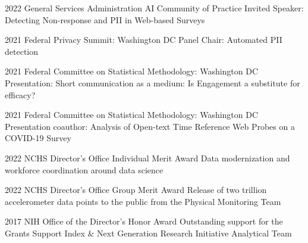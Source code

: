 \documentclass[]{scrartcl}
\begin{document}
\begin{cleanCV}
\WorkExperienceX
{2022}
{General Services Administration AI Community of Practice}
{Invited Speaker: Detecting Non-response and PII in Web-based Surveys}

\WorkExperienceX
{2021}
{Federal Privacy Summit: Washington DC}
{Panel Chair: Automated PII detection}

\WorkExperienceX
{2021}
{Federal Committee on Statistical Methodology: Washington DC}
{Presentation: Short communication as a medium: Is Engagement a substitute for efficacy?}

\WorkExperienceX
{2021}
{Federal Committee on Statistical Methodology: Washington DC}
{Presentation coauthor: Analysis of Open-text Time Reference Web Probes on a COVID-19 Survey}



\WorkExperienceX
{2022}
{NCHS Director's Office Individual Merit Award}
{Data modernization and workforce coordination around data science}

\WorkExperienceX
{2022}
{NCHS Director's Office Group Merit Award}
{Release of two trillion accelerometer data points to the public from the Physical Monitoring Team}

\WorkExperienceX
{2017}
{NIH Office of the Director's Honor Award}
{Outstanding support for the Grants Support Index \& Next Generation Research Initiative Analytical Team}


\end{cleanCV}
\end{document}
